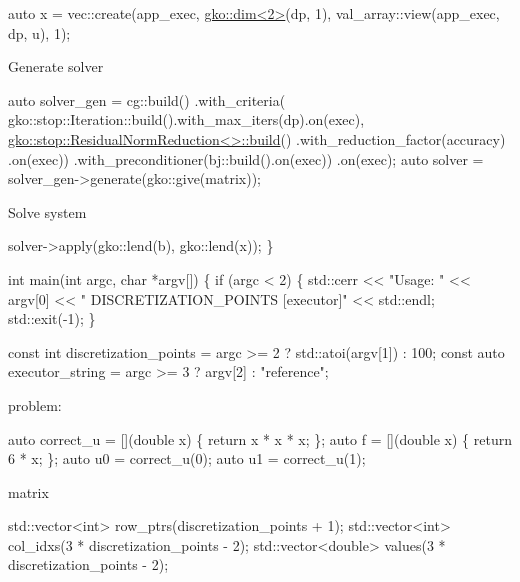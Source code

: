 \begin{DoxyCode}
\textcolor{keyword}{auto} x = vec::create(app\_exec, \hyperlink{structgko_1_1dim}{gko::dim<2>}(dp, 1),
                     val\_array::view(app\_exec, dp, u), 1);
\end{DoxyCode}


Generate solver


\begin{DoxyCode}
\textcolor{keyword}{auto} solver\_gen =
    cg::build()
        .with\_criteria(
            gko::stop::Iteration::build().with\_max\_iters(dp).on(exec),
            \hyperlink{classgko_1_1stop_1_1ResidualNormReduction}{gko::stop::ResidualNormReduction<>::build}()
                .with\_reduction\_factor(accuracy)
                .on(exec))
        .with\_preconditioner(bj::build().on(exec))
        .on(exec);
\textcolor{keyword}{auto} solver = solver\_gen->generate(gko::give(matrix));
\end{DoxyCode}


Solve system


\begin{DoxyCode}
    solver->apply(gko::lend(b), gko::lend(x));
\}


\textcolor{keywordtype}{int} main(\textcolor{keywordtype}{int} argc, \textcolor{keywordtype}{char} *argv[])
\{
    \textcolor{keywordflow}{if} (argc < 2) \{
        std::cerr << \textcolor{stringliteral}{"Usage: "} << argv[0] << \textcolor{stringliteral}{" DISCRETIZATION\_POINTS [executor]"}
                  << std::endl;
        std::exit(-1);
    \}

    \textcolor{keyword}{const} \textcolor{keywordtype}{int} discretization\_points = argc >= 2 ? std::atoi(argv[1]) : 100;
    \textcolor{keyword}{const} \textcolor{keyword}{auto} executor\_string = argc >= 3 ? argv[2] : \textcolor{stringliteral}{"reference"};
\end{DoxyCode}


problem\+:


\begin{DoxyCode}
\textcolor{keyword}{auto} correct\_u = [](\textcolor{keywordtype}{double} x) \{ \textcolor{keywordflow}{return} x * x * x; \};
\textcolor{keyword}{auto} f = [](\textcolor{keywordtype}{double} x) \{ \textcolor{keywordflow}{return} 6 * x; \};
\textcolor{keyword}{auto} u0 = correct\_u(0);
\textcolor{keyword}{auto} u1 = correct\_u(1);
\end{DoxyCode}


matrix


\begin{DoxyCode}
std::vector<int> row\_ptrs(discretization\_points + 1);
std::vector<int> col\_idxs(3 * discretization\_points - 2);
std::vector<double> values(3 * discretization\_points - 2);
\end{DoxyCode}


